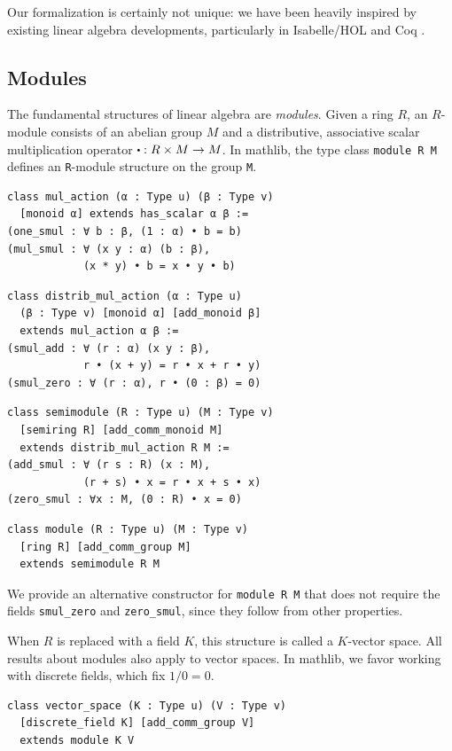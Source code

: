 \documentclass[sigplan]{acmart}\settopmatter{}
\newcommand{\mathlib}{\textsf{mathlib}\xspace}
\newcommand\smul[1][.5]{\mathbin{\vcenter{\hbox{\scalebox{#1}{$\bullet$}}}}}
\begin{document}
Our formalization is certainly not unique:
we have been heavily inspired by existing linear algebra developments,
particularly in Isabelle/HOL
\cite{Lee14, Diva13, Aran14}
and Coq \cite{Gont11}.

\subsection{Modules}
\label{subsection:linalg:module}

The fundamental structures of linear algebra are \emph{modules}.
Given a ring $R$,
an $R$-module consists of
an abe\-lian group $M$ and
a distributive, associative scalar multiplication operator $\smul : R \times M \to M$.
In \mathlib,
the type class \lstinline{module R M} defines an \lstinline{R}-module structure on the group \lstinline{M}.

\begin{lstlisting}
class mul_action (α : Type u) (β : Type v)
  [monoid α] extends has_scalar α β :=
(one_smul : ∀ b : β, (1 : α) • b = b)
(mul_smul : ∀ (x y : α) (b : β),
            (x * y) • b = x • y • b)
\end{lstlisting}
\begin{lstlisting}
class distrib_mul_action (α : Type u)
  (β : Type v) [monoid α] [add_monoid β]
  extends mul_action α β :=
(smul_add : ∀ (r : α) (x y : β),
            r • (x + y) = r • x + r • y)
(smul_zero : ∀ (r : α), r • (0 : β) = 0)
\end{lstlisting}
\begin{lstlisting}
class semimodule (R : Type u) (M : Type v)
  [semiring R] [add_comm_monoid M]
  extends distrib_mul_action R M :=
(add_smul : ∀ (r s : R) (x : M),
            (r + s) • x = r • x + s • x)
(zero_smul : ∀x : M, (0 : R) • x = 0)
\end{lstlisting}
\begin{lstlisting}
class module (R : Type u) (M : Type v)
  [ring R] [add_comm_group M]
  extends semimodule R M
\end{lstlisting}
We provide an alternative constructor for \lstinline{module R M}
that does not require the fields \lstinline{smul_zero} and \lstinline{zero_smul},
since they follow from other properties.

When $R$ is replaced with a field $K$,
this structure is called a $K$-vector space.
All results about modules also apply to vector spaces.
In \mathlib, we favor working with discrete fields,
which fix $1/0=0$.

\begin{lstlisting}
class vector_space (K : Type u) (V : Type v)
  [discrete_field K] [add_comm_group V]
  extends module K V
\end{lstlisting}
\end{document}
